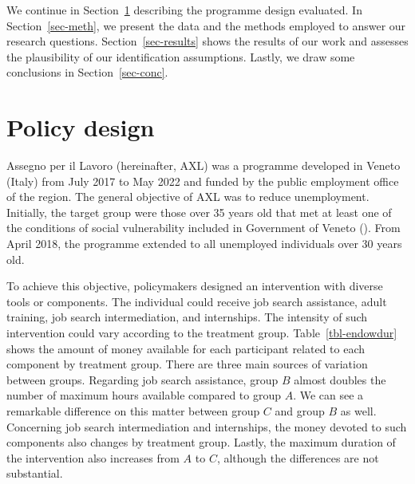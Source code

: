 \documentclass[
  11pt]{article}
\begin{document}
We continue in Section~\ref{sec-policy} describing the programme design
evaluated. In Section~\ref{sec-meth}, we present the data and the
methods employed to answer our research questions.
Section~\ref{sec-results} shows the results of our work and assesses the
plausibility of our identification assumptions. Lastly, we draw some
conclusions in Section~\ref{sec-conc}.

\section{Policy design}\label{sec-policy}

Assegno per il Lavoro (hereinafter, AXL) was a programme developed in
Veneto (Italy) from July 2017 to May 2022 and funded by the public
employment office of the region. The general objective of AXL was to
reduce unemployment. Initially, the target group were those over 35
years old that met at least one of the conditions of social
vulnerability included in Government of Veneto
(). From April 2018, the programme
extended to all unemployed individuals over 30 years old.

To achieve this objective, policymakers designed an intervention with
diverse tools or components. The individual could receive job search
assistance, adult training, job search intermediation, and internships.
The intensity of such intervention could vary according to the treatment
group. Table~\ref{tbl-endowdur} shows the amount of money available for
each participant related to each component by treatment group. There are
three main sources of variation between groups. Regarding job search
assistance, group \(B\) almost doubles the number of maximum hours
available compared to group \(A\). We can see a remarkable difference on
this matter between group \(C\) and group \(B\) as well. Concerning job
search intermediation and internships, the money devoted to such
components also changes by treatment group. Lastly, the maximum duration
of the intervention also increases from \(A\) to \(C\), although the
differences are not substantial.
\end{document}
